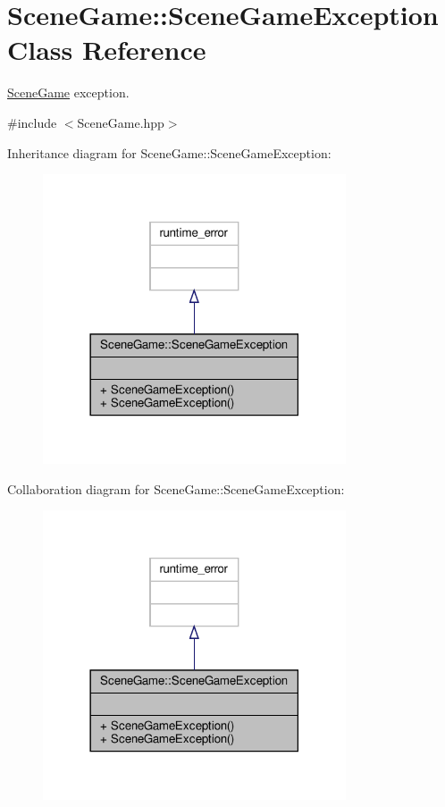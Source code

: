 \hypertarget{class_scene_game_1_1_scene_game_exception}{}\section{Scene\+Game\+:\+:Scene\+Game\+Exception Class Reference}
\label{class_scene_game_1_1_scene_game_exception}


\hyperlink{class_scene_game}{Scene\+Game} exception.  




{\ttfamily \#include $<$Scene\+Game.\+hpp$>$}



Inheritance diagram for Scene\+Game\+:\+:Scene\+Game\+Exception\+:
\nopagebreak
\begin{figure}[H]
\begin{center}
\leavevmode
\includegraphics[width=254pt]{class_scene_game_1_1_scene_game_exception__inherit__graph}
\end{center}
\end{figure}


Collaboration diagram for Scene\+Game\+:\+:Scene\+Game\+Exception\+:
\nopagebreak
\begin{figure}[H]
\begin{center}
\leavevmode
\includegraphics[width=254pt]{class_scene_game_1_1_scene_game_exception__coll__graph}
\end{center}
\end{figure}
